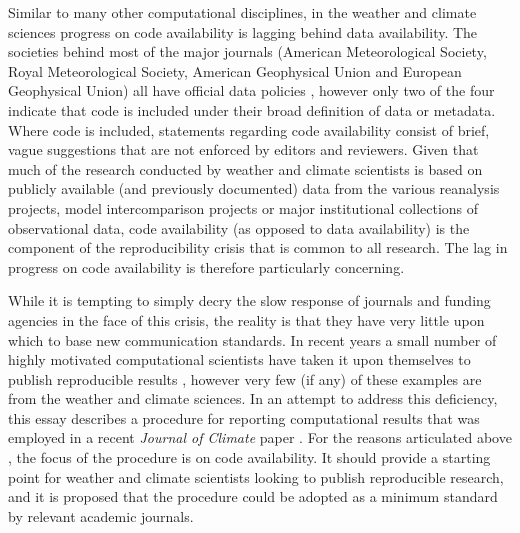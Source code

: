 Similar to many other computational disciplines, in the weather and climate sciences progress on code availability is lagging behind data availability. The societies behind most of the major journals (American Meteorological Society, Royal Meteorological Society, American Geophysical Union and European Geophysical Union) all have official data policies \citep[e.g.][]{Mayernik2015}, however only two of the four indicate that code is included under their broad definition of data or metadata. Where code is included, statements regarding code availability consist of brief, vague suggestions that are not enforced by editors and reviewers. Given that much of the research conducted by weather and climate scientists is based on publicly available (and previously documented) data from the various reanalysis projects, model intercomparison projects or major institutional collections of observational data, code availability (as opposed to data availability) is the component of the reproducibility crisis that is common to all research. The lag in progress on code availability is therefore particularly concerning. 

While it is tempting to simply decry the slow response of journals and funding agencies in the face of this crisis, the reality is that they have very little upon which to base new communication standards. In recent years a small number of highly motivated computational scientists have taken it upon themselves to publish reproducible results \citep[e.g.][]{Ketcheson2012,Crooks2014,Schmitt2015}, however very few (if any) of these examples are from the weather and climate sciences. In an attempt to address this deficiency, this essay describes a procedure for reporting computational results that was employed in a recent \textit{Journal of Climate} paper \citep[][; hereafter referred to as IS2015]{Irving2016}. For the reasons articulated above \citep[and the fact that data availability was already addressed in a recent BAMS essay;][]{Mayernik2015a}, the focus of the procedure is on code availability. It should provide a starting point for weather and climate scientists looking to publish reproducible research, and it is proposed that the procedure could be adopted as a minimum standard by relevant academic journals.
  
  
  
  
  
  
  